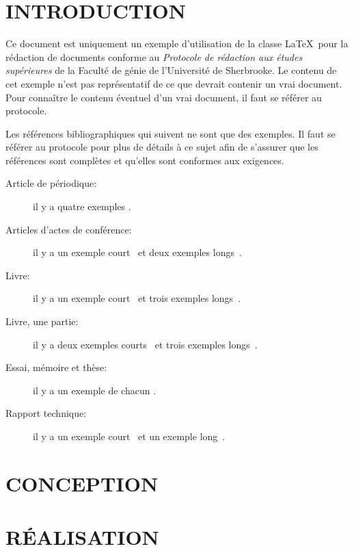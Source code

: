\documentclass[livre]{udes-genie-these}
\begin{document}
\chapter{INTRODUCTION}

Ce document est uniquement un exemple d'utilisation de la classe \LaTeX\ pour la rédaction de documents conforme au \textit{Protocole de rédaction aux études supérieures} de la Faculté de génie de l'Université de Sherbrooke.  Le contenu de cet exemple n'est pas représentatif de ce que devrait contenir un vrai document. Pour connaître le contenu éventuel d'un vrai document, il faut se référer au protocole.

Les références bibliographiques qui suivent ne sont que des exemples. Il faut se référer au protocole pour plus de détails à ce sujet afin de s'assurer que les références sont complètes et qu'elles sont conformes aux exigences.

\begin{description}
  \item[Article de périodique:]
  il y a quatre exemples \cite{burke1995,pattamatta2009,roy2009,vasu2009}.

  \item[Articles d'actes de conférence:]
  il y a un exemple court~\cite{prevenslik2009}
  et deux exemples longs~\cite{coronado2005,yeung2006}.

  \item[Livre:]
  il y a un exemple court~\cite{russell2003}
  et trois exemples longs~\cite{kececioglu1991,knuth1998-num,meriam2010}.

  \item[Livre, une partie:]
  il y a deux exemples courts~\cite{cormen2001,gaddis2009}
  et trois exemples longs~\cite{kececioglu1991-partie,knuth1998-sort,meriam2010-dist}.

  \item[Essai, mémoire et thèse:]
  il y a un exemple de chacun \cite{belanger2009,chafei2009,francoeur2009}.

  \item[Rapport technique:]
  il y a un exemple court~\cite{belley2008}
  et un exemple long~\cite{kernighan1991}.

\end{description}

\chapter{CONCEPTION}

\chapter{RÉALISATION}
\end{document}

